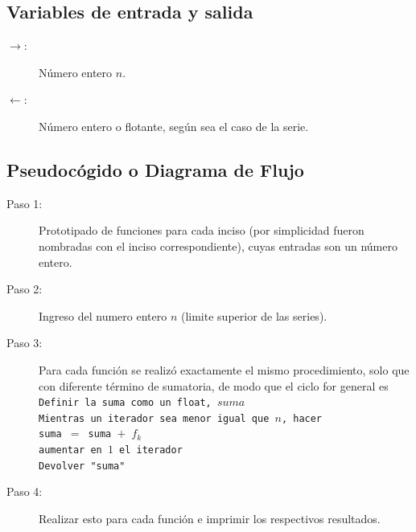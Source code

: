 \subsection{Variables de entrada y salida}
\begin{description}
	\item[$\rightarrow$: ] Número entero $n$.
	\item[$\leftarrow$: ] Número entero o flotante, según sea el caso de la serie.
\end{description}

\subsection{Pseudocógido o Diagrama de Flujo}
\begin{description}
	\item[Paso 1: ] Prototipado de funciones para cada inciso (por simplicidad fueron nombradas con el inciso correspondiente), cuyas entradas son un número entero.
	\item[Paso 2: ] Ingreso del numero entero $n$ (limite superior de las series).
	\item[Paso 3: ] Para cada función se realizó exactamente el mismo procedimiento, solo que con diferente término de sumatoria, de modo que el ciclo for general es \\
	\texttt{Definir la suma como un float, $suma$} \\
	\texttt{Mientras un iterador sea menor igual que $n$, hacer}\\
	\texttt{suma $=$ suma $+$ $f_k$}\\
	\texttt{aumentar en $1$ el iterador}\\
	\texttt{Devolver "suma"}
	\item[Paso 4: ] Realizar esto para cada función e imprimir los respectivos resultados.
\end{description}


